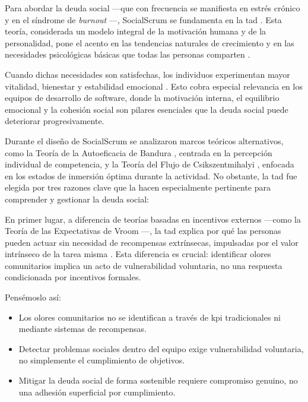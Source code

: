 Para abordar la deuda social —que con frecuencia se manifiesta en estrés crónico y en el síndrome de \textit{burnout} \cite{wilson_all_2006,tulili2022burnout}—, SocialScrum se fundamenta en la \acrfull{tad} \cite{ryan_self-determination_2000}.
Esta teoría, considerada un modelo integral de la motivación humana y de la personalidad, pone el acento en las tendencias naturales de crecimiento y en las necesidades psicológicas básicas que todas las personas comparten \cite{ryan_self-determination_2000}.

Cuando dichas necesidades son satisfechas, los individuos experimentan mayor vitalidad, bienestar y estabilidad emocional \cite{ryan_self-determination_2000}. Esto cobra especial relevancia en los equipos de desarrollo de software, donde la motivación interna, el equilibrio emocional y la cohesión social son pilares esenciales que la deuda social puede deteriorar progresivamente.

Durante el diseño de SocialScrum se analizaron marcos teóricos alternativos, como la Teoría de la Autoeficacia de Bandura \cite{bandura1997self}, centrada en la percepción individual de competencia, y la Teoría del Flujo de Csikszentmihalyi \cite{csikszentmihalyi1990flow}, enfocada en los estados de inmersión óptima durante la actividad.
No obstante, la \acrfull{tad} fue elegida por tres razones clave que la hacen especialmente pertinente para comprender y gestionar la deuda social:

En primer lugar, a diferencia de teorías basadas en incentivos externos —como la Teoría de las Expectativas de Vroom \cite{vroom1964work}—, la \acrfull{tad} explica por qué las personas pueden actuar sin necesidad de recompensas extrínsecas, impulsadas por el valor intrínseco de la tarea misma \cite{ryan_self-determination_2000}.
Esta diferencia es crucial: identificar olores comunitarios implica un acto de vulnerabilidad voluntaria, no una respuesta condicionada por incentivos formales.

Pensémoslo así:

\begin{itemize}
    \item Los olores comunitarios no se identifican a través de \acrfull{kpi} tradicionales ni mediante sistemas de recompensas.
    \item Detectar problemas sociales dentro del equipo exige vulnerabilidad voluntaria, no simplemente el cumplimiento de objetivos.
    \item Mitigar la deuda social de forma sostenible requiere compromiso genuino, no una adhesión superficial por cumplimiento.
\end{itemize}

